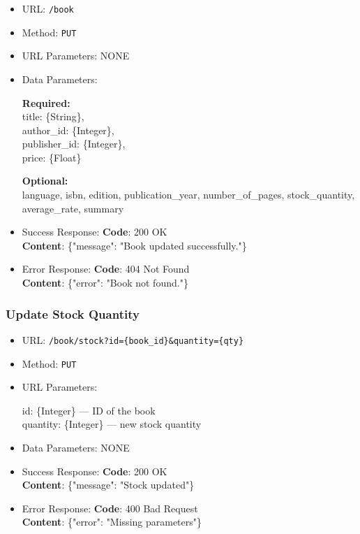 \begin{itemize}
    \item URL: \texttt{/book}
    \item Method: \texttt{PUT}
    \item URL Parameters: NONE
    \item Data Parameters:

    \textbf{Required:} \\
    title: \{String\}, \\
    author\_id: \{Integer\}, \\
    publisher\_id: \{Integer\}, \\
    price: \{Float\}

    \textbf{Optional:} \\
    language, isbn, edition, publication\_year, number\_of\_pages, stock\_quantity, average\_rate, summary


    \item Success Response: \newline
    \textbf{Code}: 200 OK \\
    \textbf{Content}: \{"message": "Book updated successfully."\}

    \item Error Response: \newline
    \textbf{Code}: 404 Not Found \\
    \textbf{Content}: \{"error": "Book not found."\}
\end{itemize}

\subsubsection*{Update Stock Quantity}

\begin{itemize}
    \item URL: \texttt{/book/stock?id=\{book\_id\}&quantity=\{qty\}}
    \item Method: \texttt{PUT}
    \item URL Parameters:

    id: \{Integer\} — ID of the book \\
    quantity: \{Integer\} — new stock quantity

    \item Data Parameters: NONE

    \item Success Response: \newline
    \textbf{Code}: 200 OK \\
    \textbf{Content}: \{"message": "Stock updated"\}

    \item Error Response: \newline
    \textbf{Code}: 400 Bad Request \\
    \textbf{Content}: \{"error": "Missing parameters"\}
\end{itemize}

